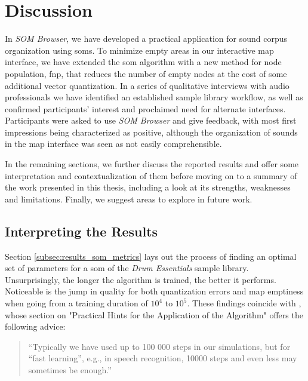 
\section{Discussion}
\label{sec:discussion}
In \textit{SOM Browser}, we have developed a practical application for sound
corpus organization using \glspl{som}. To minimize empty areas in our
interactive map interface, we have extended the \gls{som} algorithm with a new
method for node population, \gls{fnp}, that reduces the number of empty nodes at
the cost of some additional vector quantization. In a series of qualitative
interviews with audio professionals we have identified an established sample
library workflow, as well as confirmed participants' interest and proclaimed
need for alternate interfaces. Participants were asked to use \textit{SOM
Browser} and give feedback, with most first impressions being characterized as
positive, although the organization of sounds in the map interface was seen
as not easily comprehensible.

\smallskip

In the remaining sections, we further discuss the reported results and offer
some interpretation and contextualization of them before moving on to a summary
of the work presented in this thesis, including a look at its strengths,
weaknesses and limitations. Finally, we suggest areas to explore in future work.

\subsection{Interpreting the Results}
\label{subsec:discussion_results_interpretation}

Section \ref{subsec:results_som_metrics} lays out the process of finding an
optimal set of parameters for a \gls{som} of the \textit{Drum Essentials} sample
library. Unsurprisingly, the longer the algorithm is trained, the better it
performs. Noticeable is the jump in quality for both quantization errors and
map emptiness when going from a training duration of $10^4$ to $10^5$. These
findings coincide with \citet{kohonen1990}, whose section on "Practical Hints
for the Application of the Algorithm" offers the following advice:

\begin{quotation}
“Typically we have used up to 100 000 steps in our simulations, but for
“fast learning”, e.g., in speech recognition, 10000 steps and even less may
sometimes be enough.”
\end{quotation}

